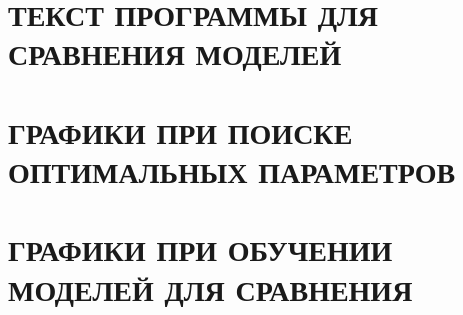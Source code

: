 \documentclass{thesis}
\begin{document}
\chapter{ТЕКСТ ПРОГРАММЫ ДЛЯ СРАВНЕНИЯ МОДЕЛЕЙ}
  \label{app:train}
\chapter{ГРАФИКИ ПРИ ПОИСКЕ ОПТИМАЛЬНЫХ ПАРАМЕТРОВ}
  \label{app:sweeps}
\chapter{ГРАФИКИ ПРИ ОБУЧЕНИИ МОДЕЛЕЙ ДЛЯ СРАВНЕНИЯ}
  \label{app:models}
\end{document}
